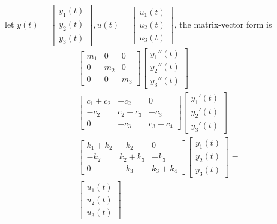 \documentclass[12pt,a4paper]{article}
\begin{document}
let 
$
    y(t) = 
    \begin{bmatrix}
        y_1(t) \\
        y_2(t) \\
        y_3(t)
    \end{bmatrix},
    u(t) =
    \begin{bmatrix}
        u_1(t) \\
        u_2(t) \\
        u_3(t)
    \end{bmatrix}
$, 
 the matrix-vector form is 
 \begin{equation}
    \begin{split}
    &\begin{bmatrix}
        m_1 & 0   & 0   \\
        0   & m_2 & 0   \\
        0   & 0   & m_3
    \end{bmatrix}
    \begin{bmatrix}
        y_1''(t) \\
        y_2''(t) \\
        y_3''(t)
    \end{bmatrix} + \\
    &\begin{bmatrix}
        c_1+c_2         & -c_2             & 0              \\
        -c_2            & c_2+c_3         & -c_3       \\
        0               & -c_3           & c_3+c_4
    \end{bmatrix}
    \begin{bmatrix}
        y_1'(t) \\
        y_2'(t) \\
        y_3'(t)
    \end{bmatrix} + \\
    &\begin{bmatrix}
        k_1+k_2         & -k_2             & 0              \\
        -k_2            & k_2+k_3         & -k_3       \\
        0               & -k_3           & k_3+k_4
    \end{bmatrix}
    \begin{bmatrix}
        y_1(t) \\
        y_2(t) \\
        y_3(t)
    \end{bmatrix} = \\
    &\begin{bmatrix}
        u_1(t) \\
        u_2(t) \\
        u_3(t)
    \end{bmatrix}
    \end{split}
\end{equation}
\end{document}
